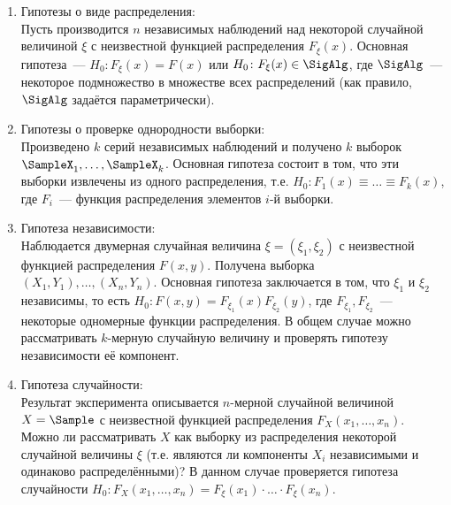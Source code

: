 \begin{enumerate}
    \item 
        Гипотезы о виде распределения: \\
        Пусть производится $n$ независимых наблюдений над некоторой случайной величиной $\xi$ с неизвестной функцией распределения $F_{\xi}(x)$.
        Основная гипотеза~--- $H_0 \colon F_{\xi}(x) = F(x)$ или $H_0 \colon F_{\xi}(x) \in \SigAlg$, где $\SigAlg$~--- 
        некоторое подмножество в множестве всех распределений (как правило, $\SigAlg$ задаётся параметрически).
    \item 
        Гипотезы о проверке однородности выборки: \\
        Произведено $k$ серий независимых наблюдений и получено $k$ выборок $\SampleX_1, \ldots, \SampleX_k$.
        Основная гипотеза состоит в том, что эти выборки извлечены из одного распределения, т.е.
        $H_0 \colon F_1(x) \equiv \ldots \equiv F_k(x)$, где $F_i$~--- функция распределения элементов $i$-й выборки.
    \item 
        Гипотеза независимости: \\
        Наблюдается двумерная случайная величина $\xi = (\xi_1, \xi_2)$ с неизвестной функцией распределения $F(x, y)$.
        Получена выборка $(X_1, Y_1), \ldots, (X_n, Y_n)$.
        Основная гипотеза заключается в том, что $\xi_1$ и $\xi_2$ независимы, 
        то есть $H_0\colon F(x, y) = F_{\xi_1}(x) F_{\xi_2}(y)$, где $F_{\xi_1}, F_{\xi_2}$~--- некоторые одномерные функции распределения.
        В общем случае можно рассматривать $k$-мерную случайную величину и проверять гипотезу независимости её компонент.
        
    \item 
        Гипотеза случайности: \\
        Результат эксперимента описывается $n$-мерной случайной величиной $X = \Sample$ с неизвестной функцией распределения $F_{X}(x_1, \ldots, x_n)$.
        Можно ли рассматривать $X$ как выборку из распределения некоторой случайной величины $\xi$ (т.е. являются ли компоненты $X_i$ независимыми и одинаково распределёнными)?
        В данном случае проверяется гипотеза случайности $H_0\colon F_{X}(x_1, \ldots, x_n) = F_{\xi}(x_1) \cdot \ldots \cdot F_{\xi}(x_n)$.

\end{enumerate}

